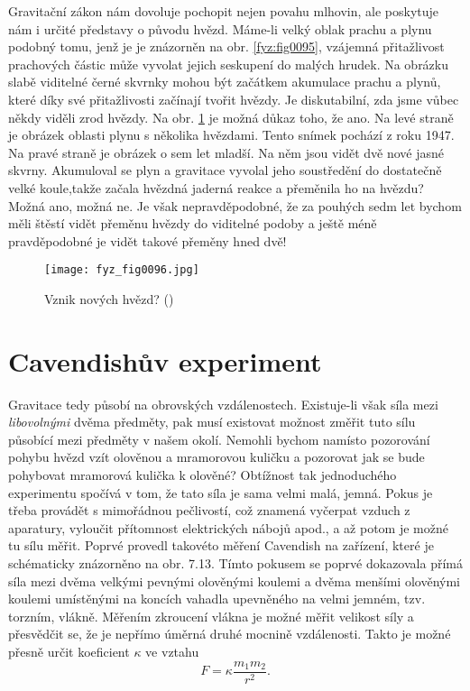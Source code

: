     Gravitační zákon nám dovoluje pochopit nejen povahu mlhovin, ale poskytuje nám i určité 
    představy o původu hvězd. Máme-li velký oblak prachu a plynu podobný tomu, jenž je je znázorněn 
    na obr. \ref{fyz:fig0095}, vzájemná přitažlivost prachových částic může vyvolat jejich seskupení 
    do malých hrudek. Na obrázku slabě viditelné  černé skvrnky mohou být začátkem 
    akumulace prachu a plynů, které díky své přitažlivosti začínají tvořit hvězdy. Je diskutabilní, 
    zda jsme vůbec někdy viděli zrod hvězdy. Na obr. \ref{fyz:fig0096} je možná důkaz toho, že ano. 
    Na levé straně je obrázek oblasti plynu s několika hvězdami. Tento snímek pochází z roku 
    \num{1947}. Na pravé straně je obrázek o sem let mladší. Na něm jsou vidět dvě nové jasné 
    skvrny. Akumuloval se plyn a gravitace vyvolal jeho soustředění do dostatečně velké koule,takže 
    začala hvězdná jaderná reakce a přeměnila ho na hvězdu? Možná ano, možná ne. Je však 
    nepravděpodobné, že za pouhých sedm let bychom měli štěstí vidět přeměnu hvězdy do viditelné 
    podoby a ještě méně pravděpodobné je vidět takové přeměny hned dvě!

    \begin{figure}[ht!]  %
      \centering
      \texttt{[image: fyz\_fig0096.jpg]}
      \caption{Vznik nových hvězd? (\cite[s.~101]{Feynman01})}
      \label{fyz:fig0096}
    \end{figure}
    
  \section{Cavendishův experiment}
    Gravitace tedy působí na obrovských vzdálenostech. Existuje-li však síla mezi 
    \emph{libovolnými} dvěma předměty, pak musí existovat možnost změřit tuto sílu působící mezi 
    předměty v našem okolí. Nemohli bychom namísto pozorování pohybu hvězd vzít olověnou a 
    mramorovou kuličku a pozorovat jak se bude pohybovat mramorová kulička k olověné? Obtížnost tak 
    jednoduchého experimentu spočívá v tom, že tato síla je sama velmi malá, jemná. Pokus je třeba 
    provádět s mimořádnou pečlivostí, což znamená vyčerpat vzduch z aparatury, vyloučit přítomnost 
    elektrických nábojů apod., a až potom je možné tu sílu měřit. Poprvé provedl takovéto měření 
    Cavendish na zařízení, které je schématicky znázorněno na obr. 7.13. Tímto pokusem se poprvé 
    dokazovala přímá síla mezi dvěma velkými pevnými olověnými koulemi a dvěma menšími olověnými 
    koulemi umístěnými na koncích vahadla upevněného na velmi jemném, tzv. torzním, vlákně. Měřením 
    zkroucení vlákna je možné měřit velikost síly a přesvědčit se, že je nepřímo úměrná druhé 
    mocnině vzdálenosti. Takto je možné přesně určit koeficient \(\kappa\) ve vztahu
    \begin{equation}\label{fyz:eq094}
      F = \kappa\frac{m_1m_2}{r^2}.
    \end{equation}
    
